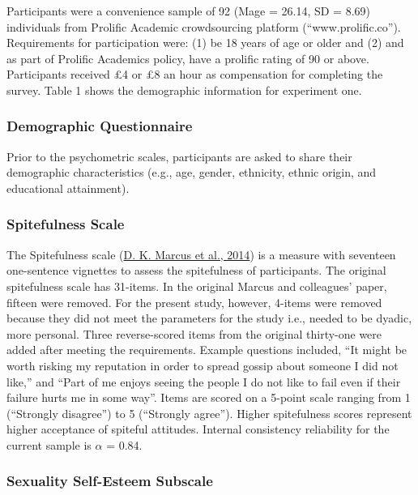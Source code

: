 \documentclass[
  donotrepeattitle,doc, 12pt, a4paper,floatsintext]{apa7}
\begin{document}
Participants were a convenience sample of 92 (Mage = 26.14, SD = 8.69) individuals from Prolific Academic crowdsourcing platform (``www.prolific.co''). Requirements for participation were: (1) be 18 years of age or older and (2) and as part of Prolific Academics policy, have a prolific rating of 90 or above. Participants received £4 or £8 an hour as compensation for completing the survey. Table 1 shows the demographic information for experiment one.

\hypertarget{demographic-questionnaire}{%
\subsubsection{Demographic Questionnaire}\label{demographic-questionnaire}}

Prior to the psychometric scales, participants are asked to share their demographic characteristics (e.g., age, gender, ethnicity, ethnic origin, and educational attainment).

\hypertarget{spitefulness-scale}{%
\subsubsection{Spitefulness Scale}\label{spitefulness-scale}}

The Spitefulness scale (\protect\hyperlink{ref-marcus2014}{D. K. Marcus et al., 2014}) is a measure with seventeen one-sentence vignettes to assess the spitefulness of participants. The original spitefulness scale has 31-items. In the original Marcus and colleagues' paper, fifteen were removed. For the present study, however, 4-items were removed because they did not meet the parameters for the study i.e., needed to be dyadic, more personal. Three reverse-scored items from the original thirty-one were added after meeting the requirements. Example questions included, ``It might be worth risking my reputation in order to spread gossip about someone I did not like,'' and ``Part of me enjoys seeing the people I do not like to fail even if their failure hurts me in some way''. Items are scored on a 5-point scale ranging from 1 (``Strongly disagree'') to 5 (``Strongly agree''). Higher spitefulness scores represent higher acceptance of spiteful attitudes. Internal consistency reliability for the current sample is \(\alpha\) = 0.84.

\hypertarget{sexuality-self-esteem-subscale}{%
\subsubsection{Sexuality Self-Esteem Subscale}\label{sexuality-self-esteem-subscale}}
\end{document}
